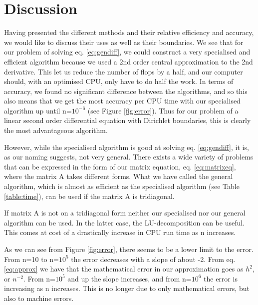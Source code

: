 \section{Discussion}
\label{sec:discussion}

Having presented the different methods and their relative efficiency and
accuracy, we would like to discuss their uses as well as their boundaries.
We see that for our problem of solving eq. \ref{eq:gendiff}, we could construct
a very specialised and efficient algorithm because we used a 2nd order
central approximation to the 2nd derivative. This let us reduce the number of
flops by a half, and our computer should, with an optimised CPU, only have to do
half the work. In terms of accuracy, we found no significant difference between
the algorithms, and so this also means that we get the most accuracy per CPU time
with our specialised algorithm up until n=$10^{-6}$ (see Figure \ref{fig:error}).
Thus for our problem of a linear second order differential equation with
Dirichlet boundaries, this is clearly the most advantageous algorithm.

However, while the specialised algorithm is good at solving eq. \ref{eq:gendiff},
it is, as our naming suggests, not very general. There exists a wide variety of
problems that can be expressed in the form of our matrix equation, eq.
\ref{eq:matrixeq}, where the matrix A takes different forms. What we have called the general algorithm, which is almost as efficient as the specialised algorithm (see Table \ref{table:time}), can be used if the matrix A is tridiagonal.

If matrix A is not on a tridiagonal form neither our specialised nor our general algorithm can be used. In the latter case, the LU-decomposition can be useful. This comes at cost of a drastically increase in CPU run time as n increases.  
 


As we can see from Figure \ref{fig:error}, there seems to be a lower limit to the error. From n=10 to n=$10^5$ the error decreases with a slope of about -2. From eq. \ref{eq:approx} we have that the mathematical error in our approximation goes as $h^2$, or $n^{-2}$. From n=$10^5$ and up the slope increases, and from n=$10^6$ the error is increasing as n increases. This is no longer due to only mathematical errors, but also to machine errors. 